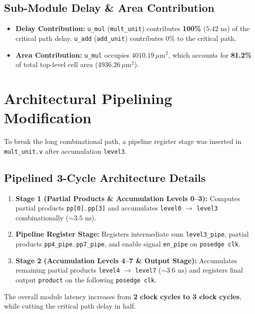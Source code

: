 \documentclass[12pt,a4paper]{article}
\begin{document}
\subsection{Sub-Module Delay \& Area Contribution}
\begin{itemize}
  \item \textbf{Delay Contribution:} \texttt{u\_mul} (\texttt{mult\_unit}) contributes \textbf{100\%} ($5.42\text{ ns}$) of the critical path delay. \texttt{u\_add} (\texttt{add\_unit}) contributes 0\% to the critical path.
  \item \textbf{Area Contribution:} \texttt{u\_mul} occupies $4010.19\,\mu\text{m}^2$, which accounts for \textbf{81.2\%} of total top-level cell area ($4936.26\,\mu\text{m}^2$).
\end{itemize}

\section{Architectural Pipelining Modification}

To break the long combinational path, a pipeline register stage was inserted in \texttt{mult\_unit.v} after accumulation \texttt{level3}.

\subsection{Pipelined 3-Cycle Architecture Details}
\begin{enumerate}
  \item \textbf{Stage 1 (Partial Products \& Accumulation Levels 0--3):} Computes partial products \texttt{pp[0]}..\texttt{pp[3]} and accumulates \texttt{level0} $\to$ \texttt{level3} combinationally ($\sim 3.5\text{ ns}$).
  \item \textbf{Pipeline Register Stage:} Registers intermediate sum \texttt{level3\_pipe}, partial products \texttt{pp4\_pipe}..\texttt{pp7\_pipe}, and enable signal \texttt{en\_pipe} on \texttt{posedge clk}.
  \item \textbf{Stage 2 (Accumulation Levels 4--7 \& Output Stage):} Accumulates remaining partial products \texttt{level4} $\to$ \texttt{level7} ($\sim 3.6\text{ ns}$) and registers final output \texttt{product} on the following \texttt{posedge clk}.
\end{enumerate}

The overall module latency increases from \textbf{2 clock cycles to 3 clock cycles}, while cutting the critical path delay in half.
\end{document}
